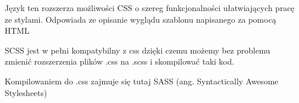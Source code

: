 Język ten rozszerza możliwości CSS o szereg funkcjonalności ułatwiających pracę ze stylami. Odpowiada ze opisanie wyglądu szablonu napisanego za pomocą HTML 

SCSS jest w pełni kompatybilny z css dzięki czemu możemy bez problemu zmienić rozszerzenia plików .css na .scss i skompilować taki kod. 

Kompilowaniem do .css zajmuje się tutaj SASS (ang. Syntactically Awesome Stylesheets) 